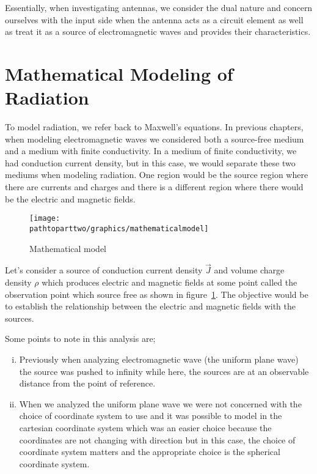 Essentially, when investigating antennas, we consider the dual nature and concern ourselves with the input side when the antenna acts as a circuit element as well as treat it as a source of electromagnetic waves and provides their characteristics. 

\section{Mathematical Modeling of Radiation}
To model radiation, we refer back to Maxwell's equations. In previous chapters, when modeling electromagnetic waves we considered both a source-free medium and a medium with finite conductivity. In a medium of finite conductivity, we had conduction current density, but in this case, we would separate these two mediums when modeling radiation. One region would be the source region where there are currents and charges and there is a different region where there would be the electric and magnetic fields.
\begin{figure}[h]
\centering
\texttt{[image: \\pathtoparttwo/graphics/mathematicalmodel]}
\caption{Mathematical model}
\label{fig:mathematicalmodel}
\end{figure}

Let's consider a source of conduction current density $\vec{J}$ and volume charge density $\rho$ which produces electric and magnetic fields at some point called the observation point which source free as shown in figure~\ref{fig:mathematicalmodel}. The objective would be to establish the relationship between the electric and magnetic fields with the sources.

Some points to note in this analysis are;
\begin{enumerate}[(i)]
\item Previously when analyzing electromagnetic wave (the uniform plane wave) the source was pushed to infinity while here, the sources are at an observable distance from the point of reference.
\item When we analyzed the uniform plane wave we were not concerned with the choice of coordinate system to use and it was possible to model in the cartesian coordinate system which was an easier choice because the coordinates are not changing with direction but in this case, the choice of coordinate system matters and the appropriate choice is the spherical coordinate system.
\end{enumerate}

